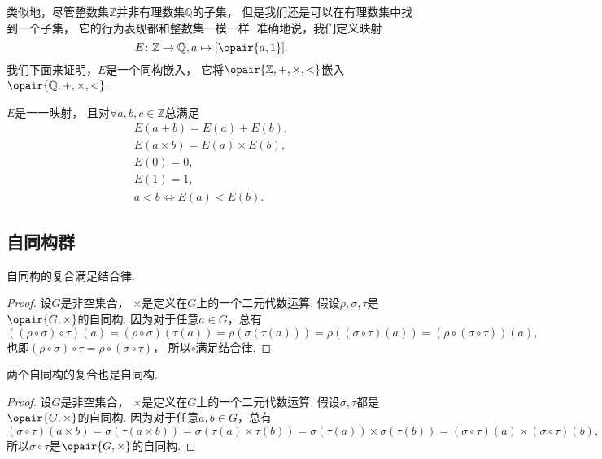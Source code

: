 类似地，尽管整数集\(\mathbb{Z}\)并非有理数集\(\mathbb{Q}\)的子集，
但是我们还是可以在有理数集中找到一个子集，
它的行为表现都和整数集一模一样.
准确地说，我们定义映射\[
	E\colon \mathbb{Z}\to\mathbb{Q}, a\mapsto[\opair{a,1}].
\]
我们下面来证明，\(E\)是一个同构嵌入，
它将\(\opair{\mathbb{Z},+,\times,<}\)嵌入\(\opair{\mathbb{Q},+,\times,<}\).
\begin{theorem}
\(E\)是一一映射，
且对\(\forall a,b,c\in\mathbb{Z}\)总满足\begin{gather}
	E(a+b)=E(a)+E(b), \\
	E(a \times b)=E(a) \times E(b), \\
	E(0)=0, \\
	E(1)=1, \\
	a<b \iff E(a)<E(b).
\end{gather}
\end{theorem}

\subsection{自同构群}
\begin{theorem}\label{theorem:抽象代数.自同构的复合满足结合律}
自同构的复合满足结合律.
\begin{proof}
设\(G\)是非空集合，
\(\times\)是定义在\(G\)上的一个二元代数运算.
假设\(\rho,\sigma,\tau\)是\(\opair{G,\times}\)的自同构.
因为对于任意\(a\in G\)，总有\[
	((\rho\circ\sigma)\circ\tau)(a)
	= (\rho\circ\sigma)(\tau(a))
	= \rho(\sigma(\tau(a)))
	= \rho((\sigma\circ\tau)(a))
	= (\rho\circ(\sigma\circ\tau))(a),
\]
也即\((\rho\circ\sigma)\circ\tau=\rho\circ(\sigma\circ\tau)\)，
所以\(\circ\)满足结合律.
\end{proof}
\end{theorem}

\begin{theorem}\label{theorem:抽象代数.两个自同构的复合是自同构}
两个自同构的复合也是自同构.
\begin{proof}
设\(G\)是非空集合，
\(\times\)是定义在\(G\)上的一个二元代数运算.
假设\(\sigma,\tau\)都是\(\opair{G,\times}\)的自同构.
因为对于任意\(a,b\in G\)，总有\[
	(\sigma\circ\tau)(a \times b)
	= \sigma(\tau(a \times b))
	= \sigma(\tau(a)\times\tau(b))
	= \sigma(\tau(a))\times\sigma(\tau(b))
	= (\sigma\circ\tau)(a)\times(\sigma\circ\tau)(b),
\]
所以\(\sigma\circ\tau\)是\(\opair{G,\times}\)的自同构.
\end{proof}
\end{theorem}

